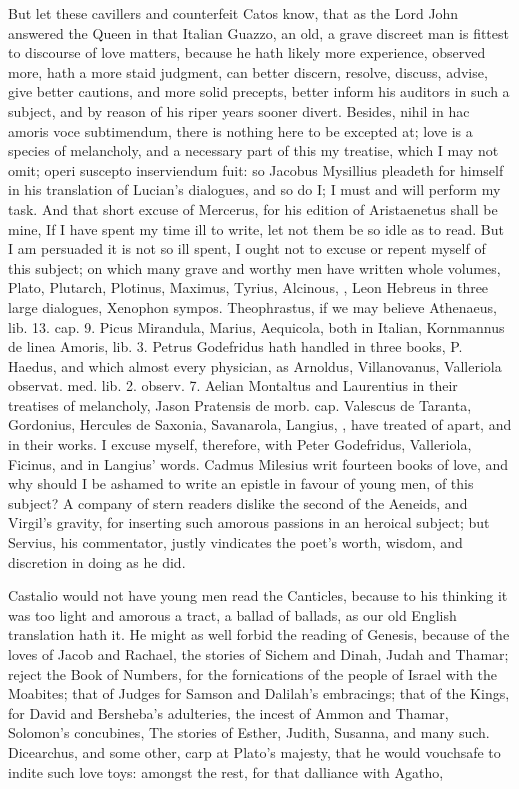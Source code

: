 {But let these cavillers and counterfeit Catos know, that as the Lord
John answered the Queen in that Italian Guazzo, an old, a grave
discreet man is fittest to discourse of love matters, because he hath
likely more experience, observed more, hath a more staid judgment, can
better discern, resolve, discuss, advise, give better cautions, and
more solid precepts, better inform his auditors in such a subject, and
by reason of his riper years sooner divert. Besides, nihil in hac
amoris voce subtimendum, there is nothing here to be excepted at; love
is a species of melancholy, and a necessary part of this my treatise,
which I may not omit; operi suscepto inserviendum fuit: so Jacobus
Mysillius pleadeth for himself in his translation of Lucian's
dialogues, and so do I; I must and will perform my task. And that short
excuse of Mercerus, for his edition of Aristaenetus shall be mine,
If I have spent my time ill to write, let not them be so idle as
to read. But I am persuaded it is not so ill spent, I ought not to
excuse or repent myself of this subject; on which many grave and worthy
men have written whole volumes, Plato, Plutarch, Plotinus, Maximus,
Tyrius, Alcinous, \Avicenna{}, Leon Hebreus in three large dialogues,
Xenophon sympos. Theophrastus, if we may believe Athenaeus, lib. 13.
cap. 9. Picus Mirandula, Marius, Aequicola, both in Italian, Kornmannus
de linea Amoris, lib. 3. Petrus Godefridus hath handled in three books,
P. Haedus, and which almost every physician, as Arnoldus, Villanovanus,
Valleriola observat. med. lib. 2. observ. 7. Aelian Montaltus and
Laurentius in their treatises of melancholy, Jason Pratensis de morb.
cap. Valescus de Taranta, Gordonius, Hercules de Saxonia, Savanarola,
Langius, \etc{}, have treated of apart, and in their works. I excuse
myself, therefore, with Peter Godefridus, Valleriola, Ficinus, and in
Langius' words. Cadmus Milesius writ fourteen books of love, and
why should I be ashamed to write an epistle in favour of young men, of
this subject? A company of stern readers dislike the second of the
Aeneids, and Virgil's gravity, for inserting such amorous passions in
an heroical subject; but Servius, his commentator, justly
vindicates the poet's worth, wisdom, and discretion in doing as he did.

Castalio would not have young men read the Canticles, because to
his thinking it was too light and amorous a tract, a ballad of ballads,
as our old English translation hath it. He might as well forbid the
reading of Genesis, because of the loves of Jacob and Rachael, the
stories of Sichem and Dinah, Judah and Thamar; reject the Book of
Numbers, for the fornications of the people of Israel with the
Moabites; that of Judges for Samson and Dalilah's embracings; that of
the Kings, for David and Bersheba's adulteries, the incest of Ammon and
Thamar, Solomon's concubines, \etc{} The stories of Esther, Judith,
Susanna, and many such. Dicearchus, and some other, carp at Plato's
majesty, that he would vouchsafe to indite such love toys: amongst the
rest, for that dalliance with Agatho,

}
